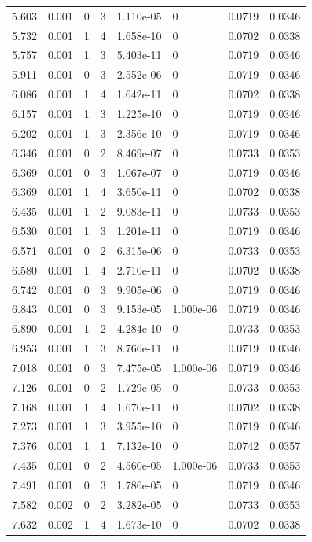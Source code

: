 \documentclass[preview]{standalone}
\begin{document}
{{{\begin{tabular}{L{1.2cm}C{1.2cm} C{0.3cm}C{0.5cm} C{1.4cm}C{1.4cm} C{1.4cm}C{1.4cm}}
  5.603  &  0.001  & 0     &  3 &  1.110e-05  & 0  & 0.0719 &  0.0346   \\ 
  5.732  &  0.001  & 1     &  4 &  1.658e-10  & 0  & 0.0702 &  0.0338   \\ 
  5.757  &  0.001  & 1     &  3 &  5.403e-11  & 0  & 0.0719 &  0.0346   \\ 
  5.911  &  0.001  & 0     &  3 &  2.552e-06  & 0  & 0.0719 &  0.0346   \\ 
  6.086  &  0.001  & 1     &  4 &  1.642e-11  & 0  & 0.0702 &  0.0338   \\ 
  6.157  &  0.001  & 1     &  3 &  1.225e-10  & 0  & 0.0719 &  0.0346   \\ 
  6.202  &  0.001  & 1     &  3 &  2.356e-10  & 0  & 0.0719 &  0.0346   \\ 
  6.346  &  0.001  & 0     &  2 &  8.469e-07  & 0  & 0.0733 &  0.0353   \\ 
  6.369  &  0.001  & 0     &  3 &  1.067e-07  & 0  & 0.0719 &  0.0346   \\ 
  6.369  &  0.001  & 1     &  4 &  3.650e-11  & 0  & 0.0702 &  0.0338   \\ 
  6.435  &  0.001  & 1     &  2 &  9.083e-11  & 0  & 0.0733 &  0.0353   \\ 
  6.530  &  0.001  & 1     &  3 &  1.201e-11  & 0  & 0.0719 &  0.0346   \\ 
  6.571  &  0.001  & 0     &  2 &  6.315e-06  & 0  & 0.0733 &  0.0353   \\ 
  6.580  &  0.001  & 1     &  4 &  2.710e-11  & 0  & 0.0702 &  0.0338   \\ 
  6.742  &  0.001  & 0     &  3 &  9.905e-06  & 0  & 0.0719 &  0.0346   \\ 
  6.843  &  0.001  & 0     &  3 &  9.153e-05  & 1.000e-06  & 0.0719 &  0.0346   \\ 
  6.890  &  0.001  & 1     &  2 &  4.284e-10  & 0  & 0.0733 &  0.0353   \\ 
  6.953  &  0.001  & 1     &  3 &  8.766e-11  & 0  & 0.0719 &  0.0346   \\ 
  7.018  &  0.001  & 0     &  3 &  7.475e-05  & 1.000e-06  & 0.0719 &  0.0346   \\ 
  7.126  &  0.001  & 0     &  2 &  1.729e-05  & 0  & 0.0733 &  0.0353   \\ 
  7.168  &  0.001  & 1     &  4 &  1.670e-11  & 0  & 0.0702 &  0.0338   \\ 
  7.273  &  0.001  & 1     &  3 &  3.955e-10  & 0  & 0.0719 &  0.0346   \\ 
  7.376  &  0.001  & 1     &  1 &  7.132e-10  & 0  & 0.0742 &  0.0357   \\ 
  7.435  &  0.001  & 0     &  2 &  4.560e-05  & 1.000e-06  & 0.0733 &  0.0353   \\ 
  7.491  &  0.001  & 0     &  3 &  1.786e-05  & 0  & 0.0719 &  0.0346   \\ 
  7.582  &  0.002  & 0     &  2 &  3.282e-05  & 0  & 0.0733 &  0.0353   \\ 
  7.632  &  0.002  & 1     &  4 &  1.673e-10  & 0  & 0.0702 &  0.0338   \\ 
\hline 
\end{tabular} 

}}}
\end{document}
